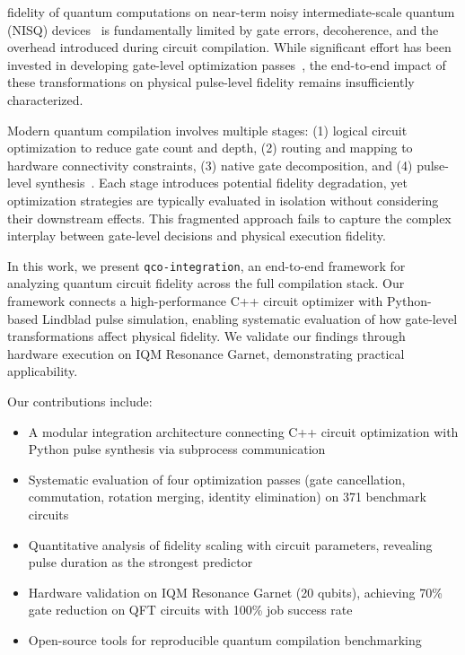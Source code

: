\documentclass[journal]{IEEEtran}
\begin{document}
 fidelity of quantum computations on near-term noisy intermediate-scale quantum (NISQ) devices~\cite{preskill2018quantum} is fundamentally limited by gate errors, decoherence, and the overhead introduced during circuit compilation. While significant effort has been invested in developing gate-level optimization passes~\cite{nam2018automated,kissinger2020reducing,lubasch2025tensor}, the end-to-end impact of these transformations on physical pulse-level fidelity remains insufficiently characterized.

Modern quantum compilation involves multiple stages: (1) logical circuit optimization to reduce gate count and depth, (2) routing and mapping to hardware connectivity constraints, (3) native gate decomposition, and (4) pulse-level synthesis~\cite{shi2019optimized}. Each stage introduces potential fidelity degradation, yet optimization strategies are typically evaluated in isolation without considering their downstream effects. This fragmented approach fails to capture the complex interplay between gate-level decisions and physical execution fidelity.

In this work, we present \texttt{qco-integration}, an end-to-end framework for analyzing quantum circuit fidelity across the full compilation stack. Our framework connects a high-performance C++ circuit optimizer with Python-based Lindblad pulse simulation, enabling systematic evaluation of how gate-level transformations affect physical fidelity. We validate our findings through hardware execution on IQM Resonance Garnet, demonstrating practical applicability.

Our contributions include:
\begin{itemize}
    \item A modular integration architecture connecting C++ circuit optimization with Python pulse synthesis via subprocess communication
    \item Systematic evaluation of four optimization passes (gate cancellation, commutation, rotation merging, identity elimination) on 371 benchmark circuits
    \item Quantitative analysis of fidelity scaling with circuit parameters, revealing pulse duration as the strongest predictor
    \item Hardware validation on IQM Resonance Garnet (20 qubits), achieving 70\% gate reduction on QFT circuits with 100\% job success rate
    \item Open-source tools for reproducible quantum compilation benchmarking
\end{itemize}
\end{document}
